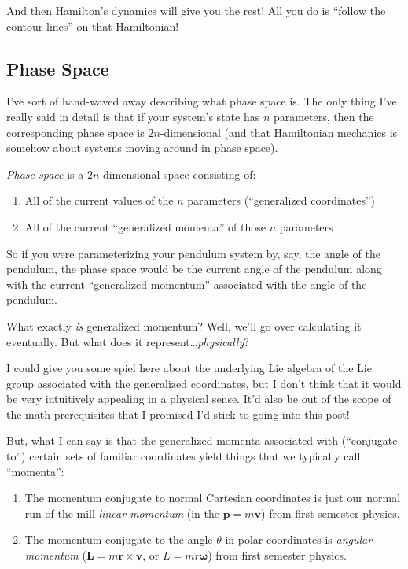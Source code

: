 \documentclass[]{article}
\begin{document}
And then Hamilton's dynamics will give you the rest! All you do is ``follow the
contour lines'' on that Hamiltonian!

\subsection{Phase Space}\label{phase-space}

I've sort of hand-waved away describing what phase space is. The only thing I've
really said in detail is that if your system's state has \(n\) parameters, then
the corresponding phase space is \(2n\)-dimensional (and that Hamiltonian
mechanics is somehow about systems moving around in phase space).

\emph{Phase space} is a \(2n\)-dimensional space consisting of:

\begin{enumerate}
\def\labelenumi{\arabic{enumi}.}
\tightlist
\item
  All of the current values of the \(n\) parameters (``generalized
  coordinates'')
\item
  All of the current ``generalized momenta'' of those \(n\) parameters
\end{enumerate}

So if you were parameterizing your pendulum system by, say, the angle of the
pendulum, the phase space would be the current angle of the pendulum along with
the current ``generalized momentum'' associated with the angle of the pendulum.

What exactly \emph{is} generalized momentum? Well, we'll go over calculating it
eventually. But what does it represent\ldots{}\emph{physically}?

I could give you some spiel here about the underlying Lie algebra of the Lie
group associated with the generalized coordinates, but I don't think that it
would be very intuitively appealing in a physical sense. It'd also be out of the
scope of the math prerequisites that I promised I'd stick to going into this
post!

But, what I can say is that the generalized momenta associated with (``conjugate
to'') certain sets of familiar coordinates yield things that we typically call
``momenta'':

\begin{enumerate}
\def\labelenumi{\arabic{enumi}.}
\item
  The momentum conjugate to normal Cartesian coordinates is just our normal
  run-of-the-mill \emph{linear momentum} (in the \(\mathbf{p} = m \mathbf{v}\))
  from first semester physics.
\item
  The momentum conjugate to the angle \(\theta\) in polar coordinates is
  \emph{angular momentum} (\(\mathbf{L} = m \mathbf{r} \times \mathbf{v}\), or
  \(L = m r \mathbf{\omega}\)) from first semester physics.
\end{enumerate}
\end{document}
